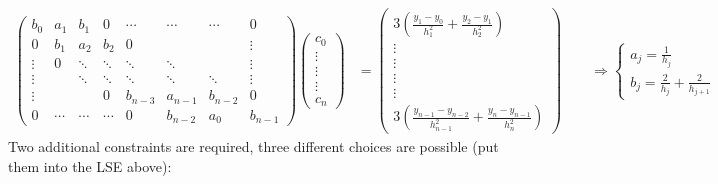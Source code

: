		\begin{align*}
		 \begin{pmatrix}
		  b_0 & a_1 & b_1 	& 0    	&\cdots&\cdots	&\cdots	 &0 \\
		  0   & b_1 & a_2 	& b_2	&0     &		&		 &\vdots\\
		\vdots& 0   &\ddots &\ddots	&\ddots&\ddots	&		 &\vdots\\
		\vdots&		&\ddots	&\ddots &\ddots&\ddots	&\ddots	 & \vdots\\
		\vdots&		&		&0     &b_{n-3}&a_{n-1}&b_{n-2} &0\\
		  0   &\cdots&\cdots&\cdots&0    &b_{n-2}&a_0	 &b_{n-1}
		 \end{pmatrix}
		 \begin{pmatrix}
		  c_0\\
		  \vdots\\
		  \vdots\\
		  \vdots\\
		  c_n
		 \end{pmatrix}
			&=
	\begin{pmatrix}
		3 \left( \frac{y_1 -y_{0}}{h_1^2}+\frac{y_{2}-y_1}{h_{2}^2}\right)\\
		\vdots\\
		\vdots\\
		\vdots\\
		\vdots\\
		3 \left( \frac{y_{n-1}-y_{n-2}}{h_{n-1}^2}+\frac{y_{n}-y_{n-1}}{h_{n}^2}\right)
	\end{pmatrix}\qquad \Rightarrow
			\left\{
				\begin{array}{l}
					a_j = \frac{1}{h_j}\\
					b_j = \frac{2}{h_j}+\frac{2}{h_{j+1}}
				\end{array}
			\right.
		\end{align*}
	Two additional constraints are required, three different choices are possible (put them into the LSE above):
